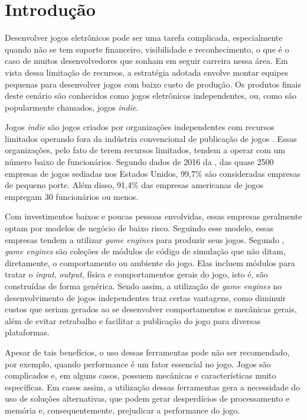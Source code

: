 \chapter*[Introdução]{Introdução}

Desenvolver jogos eletrônicos pode ser uma tarefa complicada, especialmente quando não se tem suporte financeiro, visibilidade e reconhecimento, o que é o caso de muitos desenvolvedores que sonham em seguir carreira nessa área. Em vista dessa limitação de recursos, a estratégia adotada envolve montar equipes pequenas para desenvolver jogos com baixo custo de produção. Os produtos finais deste cenário são conhecidos como jogos eletrônicos independentes, ou, como são popularmente chamados, jogos \textit{indie}.

Jogos \textit{indie} são jogos criados por organizações independentes com recursos limitados operando fora da indústria convencional de publicação de jogos \cite{end2end}. Essas organizações, pelo fato de terem recursos limitados, tendem a operar com um número baixo de funcionários. Segundo dados de 2016 da , das quase 2500 empresas de jogos sediadas nos Estados Unidos, 99,7\% são consideradas empresas de pequeno porte. Além disso, 91,4\% das empresas americanas de jogos empregam 30 funcionários ou menos.

Com investimentos baixos e poucas pessoas envolvidas, essas empresas geralmente optam por modelos de negócio de baixo risco. Seguindo esse modelo, essas empresas tendem a utilizar \textit{game engines} para produzir seus jogos. Segundo , \textit{game engines} são coleções de módulos de código de simulação que não ditam, diretamente, o comportamento ou ambiente do jogo. Elas incluem módulos para tratar o \textit{input}, \textit{output}, física e comportamentos gerais do jogo, isto é, são construídas de forma genérica. Sendo assim, a utilização de \textit{game engines} no desenvolvimento de jogos independentes traz certas vantagens, como diminuir custos que seriam gerados ao se desenvolver comportamentos e mecânicas gerais, além de evitar retrabalho e facilitar a publicação do jogo para diversas plataformas.

Apesar de tais benefícios, o uso dessas ferramentas pode não ser recomendado, por exemplo, quando performance é um fator essencial no jogo. Jogos são complicados e, em alguns casos, possuem mecânicas e características muito específicas. Em casos assim, a utilização dessas ferramentas gera a necessidade do uso de soluções alternativas, que podem gerar desperdícios de processamento e memória e, consequentemente, prejudicar a performance do jogo.

